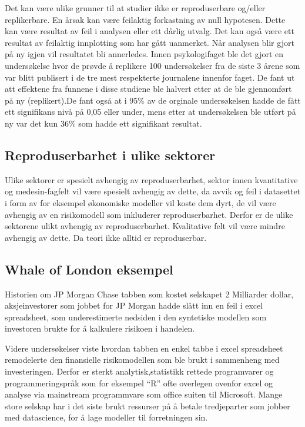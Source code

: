 \documentclass[
  norsk,
]{article}
\begin{document}
Det kan være ulike grunner til at studier ikke er reproduserbare
og/eller replikerbare. En årsak kan være feilaktig forkastning av null
hypotesen. Dette kan være resultat av feil i analysen eller ett dårlig
utvalg. Det kan også være ett resultat av feilaktig innplotting som har
gått uanmerket. Når analysen blir gjort på ny igjen vil resultatet bli
annerledes. Innen psykologifaget ble det gjort en undersøkelse hvor de
prøvde å replikere 100 undersøkelser fra de siste 3 årene som var blitt
publisert i de tre mest respekterte journalene innenfor faget. De fant
ut att effektene fra funnene i disse studiene ble halvert etter at de
ble gjennomført på ny (replikert).De fant også at i { 95\% } av de
orginale undersøkelsen hadde de fått ett signifikans nivå på 0,05 eller
under, mens etter at undersøkelsen ble utført på ny var det kun { 36\% }
som hadde ett signifikant resultat.

\hypertarget{reproduserbarhet-i-ulike-sektorer}{%
\subsection{\texorpdfstring{\textbf{Reproduserbarhet i ulike
sektorer}}{Reproduserbarhet i ulike sektorer}}\label{reproduserbarhet-i-ulike-sektorer}}

Ulike sektorer er spesielt avhengig av reproduserbarhet, sektor innen
kvantitative og medesin-fagfelt vil være spesielt avhengig av dette, da
avvik og feil i datasettet i form av for eksempel økonomiske modeller
vil koste dem dyrt, de vil være avhengig av en risikomodell som
inkluderer reproduserbarhet. Derfor er de ulike sektorene ulikt avhengig
av reproduserbarhet. Kvalitative felt vil være mindre avhengig av dette.
Da teori ikke alltid er reproduserbar.

\hypertarget{whale-of-london-eksempel}{%
\subsection{\texorpdfstring{\textbf{Whale of London
eksempel}}{Whale of London eksempel}}\label{whale-of-london-eksempel}}

Historien om JP Morgan Chase tabben som kostet selskapet 2 Milliarder
dollar, aksjeinvestorer som jobbet for JP Morgan hadde slått inn en feil
i excel spreadsheet, som underestimerte nedsiden i den syntetiske
modellen som investoren brukte for å kalkulere risikoen i handelen.

Videre undersøkelser viste hvordan tabben en enkel tabbe i excel
spreadsheet remodelerte den finansielle risikomodellen som ble brukt i
sammenheng med investeringen. Derfor er sterkt analytisk,statistikk
rettede programvarer og programmeringspråk som for eksempel ``R'' ofte
overlegen ovenfor excel og analyse via mainstream programmvare som
office suiten til Microsoft. Mange store selskap har i det siste brukt
ressurser på å betale tredjeparter som jobber med datascience, for å
lage modeller til forretningen sin.
\end{document}

